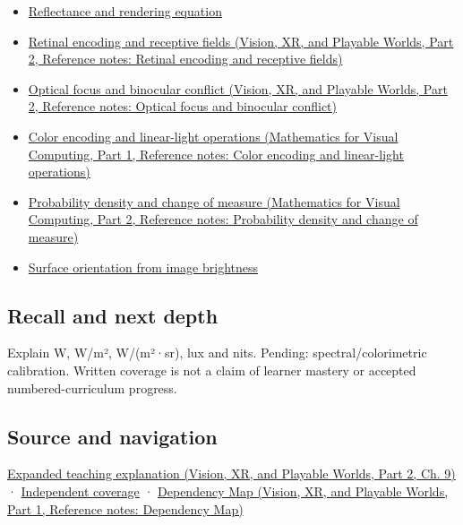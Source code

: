 \begin{itemize}
\tightlist
\item
  \hyperref[appendix-96da0b153b77]{Reflectance and rendering equation}
\item
  \href{../07-Vision-XR-and-Playable-Worlds-P02/main.pdf\#nameddest=appendix-7281c15ac44a}{Retinal encoding and receptive fields (Vision, XR, and Playable Worlds, Part 2, Reference notes: Retinal encoding and receptive fields)}
\item
  \href{../07-Vision-XR-and-Playable-Worlds-P02/main.pdf\#nameddest=appendix-f90cee1be7a4}{Optical focus and binocular conflict (Vision, XR, and Playable Worlds, Part 2, Reference notes: Optical focus and binocular conflict)}
\item
  \href{../02-Mathematics-for-Visual-Computing-P01/main.pdf\#nameddest=appendix-a9f83ad40792}{Color encoding and linear-light operations (Mathematics for Visual Computing, Part 1, Reference notes: Color encoding and linear-light operations)}
\item
  \href{../02-Mathematics-for-Visual-Computing-P02/main.pdf\#nameddest=appendix-4815cd87ab8b}{Probability density and change of measure (Mathematics for Visual Computing, Part 2, Reference notes: Probability density and change of measure)}
\item
  \hyperref[appendix-89b2d5b7c9e1]{Surface orientation from image brightness}
\end{itemize}

\subsection{Recall and next depth}\label{appendix-215c2570199b-recall-and-next-depth}

\hypertarget{appendix-215c2570199b-recall-and-next-depth}{}

Explain W, W/m², W/(m²·sr), lux and nits. Pending: spectral/colorimetric calibration. Written coverage is not a claim of learner mastery or accepted numbered-curriculum progress.

\subsection{Source and navigation}\label{appendix-215c2570199b-source-and-navigation}

\hypertarget{appendix-215c2570199b-source-and-navigation}{}

\href{../07-Vision-XR-and-Playable-Worlds-P02/main.pdf\#nameddest=04-visual-computing-ii-ch042-light-must-become-a-quantity-before-it-becomes-a-color}{Expanded teaching explanation (Vision, XR, and Playable Worlds, Part 2, Ch. 9)} · \hyperref[appendix-fd090d982a15-xr01---independent-seeing-and-representation-source]{Independent coverage} · \href{../07-Vision-XR-and-Playable-Worlds-P01/main.pdf\#nameddest=appendix-4ad47bdd269a}{Dependency Map (Vision, XR, and Playable Worlds, Part 1, Reference notes: Dependency Map)}

